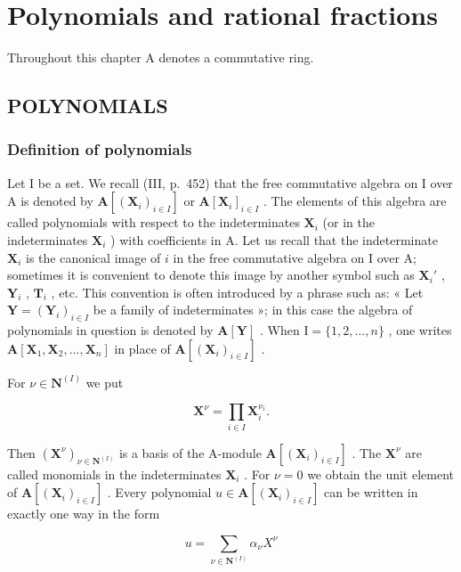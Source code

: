 \chapter{Polynomials and rational fractions}

Throughout this chapter A denotes a commutative ring.

\section{POLYNOMIALS}

\subsection{Definition of polynomials}

Let I be a set. We recall (III, p.~452) that the free commutative algebra on I over A is denoted by \(\mathbf{A}[(\mathbf{X}_i)_{i\in I}]\) or \(\mathbf{A}[\mathbf{X}_i]_{i\in I}\) . The elements of this algebra are called polynomials with respect to the indeterminates \(\mathbf{X}_i\) (or in the indeterminates \(\mathbf{X}_i\) ) with coefficients in A. Let us recall that the indeterminate \(\mathbf{X}_i\) is the canonical image of \(i\) in the free commutative algebra on I over A; sometimes it is convenient to denote this image by another symbol such as \(\mathbf{X}_i'\) , \(\mathbf{Y}_i\) , \(\mathbf{T}_i\) , etc. This convention is often introduced by a phrase such as: « Let \(\mathbf{Y} = (\mathbf{Y}_i)_{i\in I}\) be a family of indeterminates »; in this case the algebra of polynomials in question is denoted by \(\mathbf{A}[\mathbf{Y}]\) . When \(\mathrm{I} = \{1,2,\dots,n\}\) , one writes \(\mathbf{A}[\mathbf{X}_1,\mathbf{X}_2,\dots,\mathbf{X}_n]\) in place of \(\mathbf{A}[(\mathbf{X}_i)_{i\in I}]\) .

For \(\nu \in \mathbf{N}^{(I)}\) we put

\[
\mathbf {X} ^ {\nu} = \prod_ {i \in I} \mathbf {X} _ {i} ^ {\nu_ {i}}.
\]

Then \((\mathbf{X}^{\nu})_{\nu \in \mathbf{N}^{(I)}}\) is a basis of the A-module \(\mathbf{A}[(\mathbf{X}_i)_{i\in I}]\) . The \(\mathbf{X}^{\nu}\) are called monomials in the indeterminates \(\mathbf{X}_i\) . For \(\nu = 0\) we obtain the unit element of \(\mathbf{A}[(\mathbf{X}_i)_{i\in I}]\) . Every polynomial \(u\in \mathbf{A}[(\mathbf{X}_i)_{i\in I}]\) can be written in exactly one way in the form

\[
u = \sum_ {\nu \in \mathbf {N} ^ {(I)}} \alpha_ {\nu} X ^ {\nu}
\]

